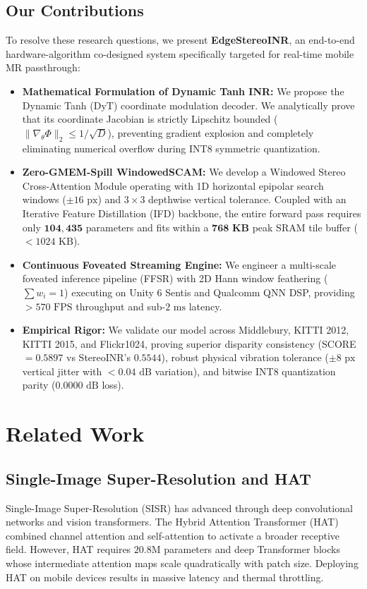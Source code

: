 \documentclass[10pt,journal,compsoc]{IEEEtran}
\begin{document}
\subsection{Our Contributions}
To resolve these research questions, we present \textbf{EdgeStereoINR}, an end-to-end hardware-algorithm co-designed system specifically targeted for real-time mobile MR passthrough:
\begin{itemize}
    \item \textbf{Mathematical Formulation of Dynamic Tanh INR:} We propose the Dynamic Tanh ($\text{DyT}$) coordinate modulation decoder. We analytically prove that its coordinate Jacobian is strictly Lipschitz bounded ($\|\nabla_\theta \Phi\|_2 \le 1/\sqrt{D}$), preventing gradient explosion and completely eliminating numerical overflow during INT8 symmetric quantization.
    \item \textbf{Zero-GMEM-Spill WindowedSCAM:} We develop a Windowed Stereo Cross-Attention Module operating with 1D horizontal epipolar search windows ($\pm 16\text{ px}$) and $3\times 3$ depthwise vertical tolerance. Coupled with an Iterative Feature Distillation (IFD) backbone, the entire forward pass requires only $\mathbf{104,435}$ parameters and fits within a $\mathbf{768\text{ KB}}$ peak SRAM tile buffer ($< 1024\text{ KB}$).
    \item \textbf{Continuous Foveated Streaming Engine:} We engineer a multi-scale foveated inference pipeline (FFSR) with 2D Hann window feathering ($\sum w_i = 1$) executing on Unity 6 Sentis and Qualcomm QNN DSP, providing $>570\text{ FPS}$ throughput and sub-$2\text{ ms}$ latency.
    \item \textbf{Empirical Rigor:} We validate our model across Middlebury, KITTI 2012, KITTI 2015, and Flickr1024, proving superior disparity consistency (SCORE $= 0.5897$ vs StereoINR's $0.5544$), robust physical vibration tolerance ($\pm 8\text{ px}$ vertical jitter with $<0.04\text{ dB}$ variation), and bitwise INT8 quantization parity ($0.0000\text{ dB}$ loss).
\end{itemize}

\section{Related Work}
\subsection{Single-Image Super-Resolution and HAT}
Single-Image Super-Resolution (SISR) has advanced through deep convolutional networks and vision transformers. The Hybrid Attention Transformer (HAT) \cite{hat2023, hat_tpami2024} combined channel attention and self-attention to activate a broader receptive field. However, HAT requires $20.8\text{M}$ parameters and deep Transformer blocks whose intermediate attention maps scale quadratically with patch size. Deploying HAT on mobile devices results in massive latency and thermal throttling.
\end{document}
